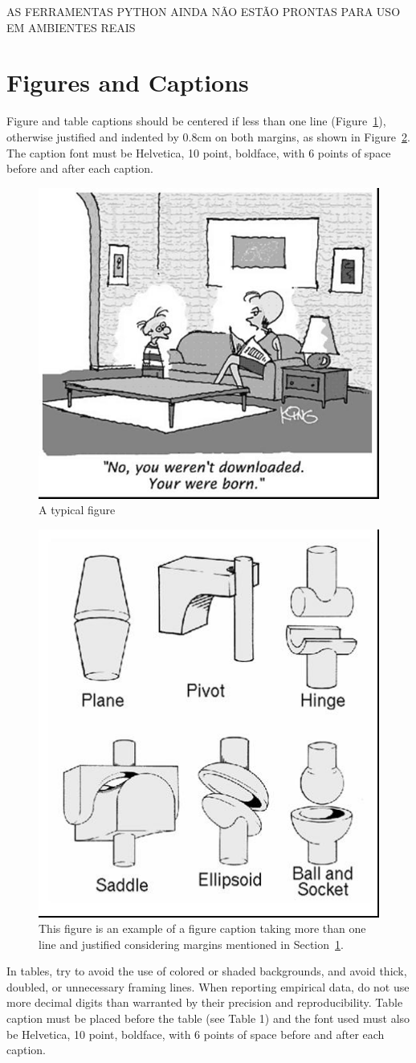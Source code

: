 \documentclass[12pt]{article}
\begin{document}
AS FERRAMENTAS PYTHON AINDA NÃO ESTÃO PRONTAS PARA USO EM AMBIENTES REAIS








\section{Figures and Captions}\label{sec:figs}


Figure and table captions should be centered if less than one line
(Figure~\ref{fig:exampleFig1}), otherwise justified and indented by 0.8cm on
both margins, as shown in Figure~\ref{fig:exampleFig2}. The caption font must
be Helvetica, 10 point, boldface, with 6 points of space before and after each
caption.

\begin{figure}[ht]
\centering
\includegraphics[width=.5\textwidth]{fig1.jpg}
\caption{A typical figure}
\label{fig:exampleFig1}
\end{figure}

\begin{figure}[ht]
\centering
\includegraphics[width=.3\textwidth]{fig2.jpg}
\caption{This figure is an example of a figure caption taking more than one
  line and justified considering margins mentioned in Section~\ref{sec:figs}.}
\label{fig:exampleFig2}
\end{figure}

In tables, try to avoid the use of colored or shaded backgrounds, and avoid
thick, doubled, or unnecessary framing lines. When reporting empirical data,
do not use more decimal digits than warranted by their precision and
reproducibility. Table caption must be placed before the table (see Table 1)
and the font used must also be Helvetica, 10 point, boldface, with 6 points of
space before and after each caption.
\end{document}
